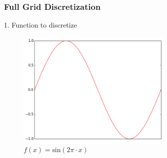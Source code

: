 \begin{frame}
  \frametitle{Full Grid Discretization}
  \topline
  \vspace{-10px}
  \begin{block}{1. Function to discretize}
    \begin{figure}[!htp]

      \centering
      \includegraphics[width=7.5cm]{images/singlebasis_1}
      \vspace{-12px}
      \caption{$f(x) =\text{sin}(2\pi \cdot x)$}
    \end{figure}
  \end{block}
\end{frame}

